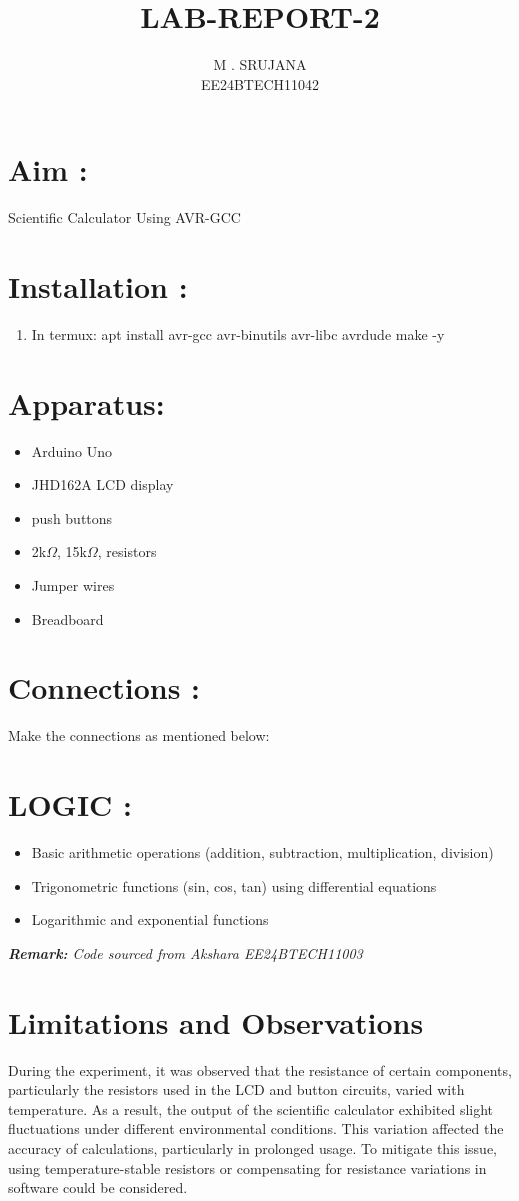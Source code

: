 \documentclass[12pt,a4paper]{article}
\title{\textbf{LAB-REPORT-2}}
\author{M . SRUJANA \\EE24BTECH11042}
\begin{document}
\maketitle

\section{Aim :} Scientific Calculator Using AVR-GCC
\section{Installation :}
\begin{enumerate}
    \item In termux: apt install avr-gcc avr-binutils avr-libc avrdude make -y
\end{enumerate}
\section{Apparatus:}
\begin{itemize}
    \item Arduino Uno
    \item JHD162A LCD display
    \item push buttons
    \item 2k$\Omega$, 15k$\Omega$,  resistors
    \item Jumper wires
    \item Breadboard
\end{itemize}
\section{Connections :}
Make the connections as mentioned below:


\section{LOGIC :}
\begin{itemize}
    \item Basic arithmetic operations (addition, subtraction, multiplication, division)
    \item Trigonometric functions (sin, cos, tan) using differential equations
    \item Logarithmic and exponential functions 
\end{itemize}


\textit{\textbf{Remark:} Code sourced from Akshara EE24BTECH11003}
\section{Limitations and Observations}  
During the experiment, it was observed that the resistance of certain components, particularly the resistors used in the LCD and button circuits, varied with temperature. As a result, the output of the scientific calculator exhibited slight fluctuations under different environmental conditions. This variation affected the accuracy of calculations, particularly in prolonged usage. To mitigate this issue, using temperature-stable resistors or compensating for resistance variations in software could be considered.  
\end{document}
